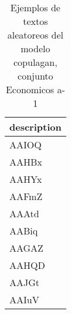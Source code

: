 \begin{table}[H]
\centering
\fontsize{8}{14}\selectfont
\caption{Ejemplos de textos aleatoreos del modelo copulagan, conjunto Economicos a-1}
\label{table-sample10-economicos-a-1-copulagan-text}
\begin{tabular}{|m{50em}|}
\hline
\rowcolor[gray]{0.8}
description \\
\hline AAIOQ \\
\hline AAHBx \\
\hline AAHYx \\
\hline AAFmZ \\
\hline AAAtd \\
\hline AABiq \\
\hline AAGAZ \\
\hline AAHQD \\
\hline AAJGt \\
\hline AAIuV \\
\hline
\end{tabular}
\end{table}
